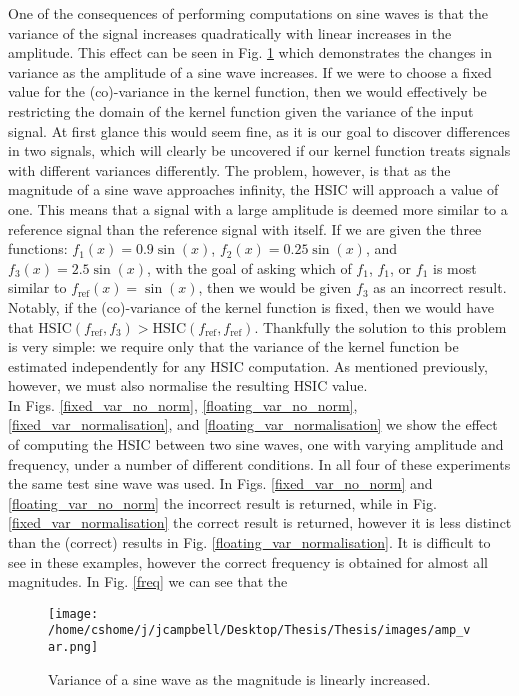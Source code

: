 One of the consequences of performing computations on sine waves is that the variance of the signal increases quadratically with linear increases in the amplitude. This effect can be seen in Fig. \ref{amp_var} which demonstrates the changes in variance as the amplitude of a sine wave increases. If we were to choose a fixed value for the (co)-variance in the kernel function, then we would effectively be restricting the domain of the kernel function given the variance of the input signal. At first glance this would seem fine, as it is our goal to discover differences in two signals, which will clearly be uncovered if our kernel function treats signals with different variances differently. The problem, however, is that as the magnitude of a sine wave approaches infinity, the HSIC will approach a value of one. This means that a signal with a large amplitude is deemed more similar to a reference signal than the reference signal with itself. If we are given the three functions: $f_1(x) = 0.9\sin(x)$, $f_2(x) = 0.25\sin(x)$, and $f_3(x) = 2.5\sin(x)$, with the goal of asking which of $f_1$, $f_1$, or $f_1$ is most similar to $f_{\text{ref}}(x) = \sin(x)$, then we would be given $f_3$ as an incorrect result. Notably, if the (co)-variance of the kernel function is fixed, then we would have that $\text{HSIC}(f_{\text{ref}}, f_3) > \text{HSIC}(f_{\text{ref}}, f_{\text{ref}})$. Thankfully the solution to this problem is very simple: we require only that the variance of the kernel function be estimated independently for any HSIC computation. As mentioned previously, however, we must also normalise the resulting HSIC value.  \\

In Figs. \ref{fixed_var_no_norm}, \ref{floating_var_no_norm}, \ref{fixed_var_normalisation}, and \ref{floating_var_normalisation} we show the effect of computing the HSIC between two sine waves, one with varying amplitude and frequency, under a number of different conditions. In all four of these experiments the same test sine wave was used. In Figs. \ref{fixed_var_no_norm} and \ref{floating_var_no_norm} the incorrect result is returned, while in Fig. \ref{fixed_var_normalisation} the correct result is returned, however it is less distinct than the (correct) results in Fig. \ref{floating_var_normalisation}. It is difficult to see in these examples, however the correct frequency is obtained for almost all magnitudes. In Fig. \ref{freq} we can see that the 



\begin{figure}[h]
\texttt{[image: /home/cshome/j/jcampbell/Desktop/Thesis/Thesis/images/amp\_var.png]}
\caption{Variance of a sine wave as the magnitude is linearly increased.\label{amp_var}}
\end{figure}

